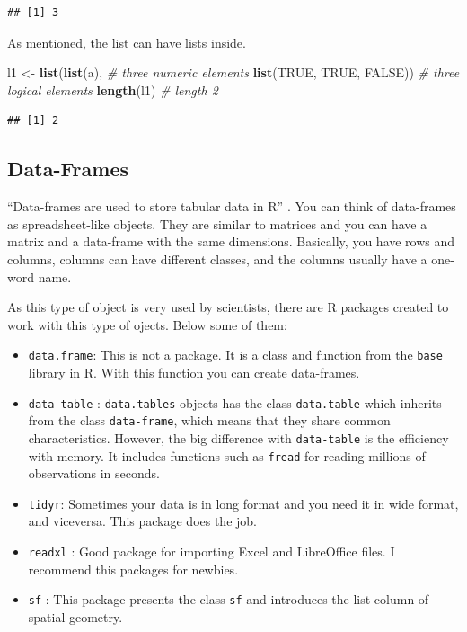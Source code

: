 \documentclass[12pt,graybox,envcountchap,sectrefs]{krantz}
\makeatletter
\newenvironment{Shaded}{\begin{snugshade}}{\end{snugshade}}
\newcommand{\KeywordTok}[1]{\textcolor[rgb]{0.13,0.29,0.53}{\textbf{#1}}}
\newcommand{\StringTok}[1]{\textcolor[rgb]{0.31,0.60,0.02}{#1}}
\newcommand{\CommentTok}[1]{\textcolor[rgb]{0.56,0.35,0.01}{\textit{#1}}}
\newcommand{\OtherTok}[1]{\textcolor[rgb]{0.56,0.35,0.01}{#1}}
\newcommand{\NormalTok}[1]{#1}
\providecommand{\tightlist}{%
  \setlength{\itemsep}{0pt}\setlength{\parskip}{0pt}}
\newenvironment{kframe}{%
\medskip{}
\setlength{\fboxsep}{.8em}
 \def\at@end@of@kframe{}%
 \ifinner\ifhmode%
  \def\at@end@of@kframe{\end{minipage}}%
  \begin{minipage}{\columnwidth}%
 \fi\fi%
 \def\FrameCommand##1{\hskip\@totalleftmargin \hskip-\fboxsep
 \colorbox{shadecolor}{##1}\hskip-\fboxsep
     \hskip-\linewidth \hskip-\@totalleftmargin \hskip\columnwidth}%
 \MakeFramed {\advance\hsize-\width
   \@totalleftmargin\z@ \linewidth\hsize
   \@setminipage}}%
 {\par\unskip\endMakeFramed%
 \at@end@of@kframe}
\renewenvironment{Shaded}{\begin{kframe}}{\end{kframe}}
\theoremstyle{definition}
\theoremstyle{definition}
\theoremstyle{definition}
\theoremstyle{remark}
\makeatother
\begin{document}
\begin{verbatim}
## [1] 3
\end{verbatim}

As mentioned, the list can have lists inside.

\begin{Shaded}
\begin{Highlighting}[]
\NormalTok{l1 <-}\StringTok{ }\KeywordTok{list}\NormalTok{(}\KeywordTok{list}\NormalTok{(a),                    }\CommentTok{# three numeric elements}
            \KeywordTok{list}\NormalTok{(}\OtherTok{TRUE}\NormalTok{, }\OtherTok{TRUE}\NormalTok{, }\OtherTok{FALSE}\NormalTok{))   }\CommentTok{# three logical elements}
\KeywordTok{length}\NormalTok{(l1)                             }\CommentTok{# length 2}
\end{Highlighting}
\end{Shaded}

\begin{verbatim}
## [1] 2
\end{verbatim}

\subsection{Data-Frames}\label{data-frames}

``Data-frames are used to store tabular data in R'' \citep{peng2015r}.
You can think of data-frames as spreadsheet-like objects. They are
similar to matrices and you can have a matrix and a data-frame with the
same dimensions. Basically, you have rows and columns, columns can have
different classes, and the columns usually have a one-word name.

As this type of object is very used by scientists, there are R packages
created to work with this type of ojects. Below some of them:

\begin{itemize}
\tightlist
\item
  \texttt{data.frame}: This is not a package. It is a class and function
  from the \texttt{base} library in R. With this function you can create
  data-frames.
\item
  \texttt{data-table} \citep{datatable}: \texttt{data.tables} objects
  has the class \texttt{data.table} which inherits from the class
  \texttt{data-frame}, which means that they share common
  characteristics. However, the big difference with \texttt{data-table}
  is the efficiency with memory. It includes functions such as
  \texttt{fread} for reading millions of observations in seconds.
\item
  \texttt{tidyr}\citep{tidyr}: Sometimes your data is in long format and
  you need it in wide format, and viceversa. This package does the job.
\item
  \texttt{readxl} \citep{readxl}: Good package for importing Excel and
  LibreOffice files. I recommend this packages for newbies.
\item
  \texttt{sf} \citep{sf}: This package presents the class \texttt{sf}
  and introduces the list-column of spatial geometry.
\end{itemize}
\end{document}
